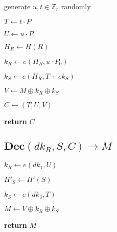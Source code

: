 \documentclass[a4paper]{article}
\begin{document}
generate $u, t \in \mathbb{Z}_r$ randomly

$T \gets t \cdot P$

$U \gets u \cdot P$

$H_R \gets H(R)$

$k_R \gets e(H_R, u \cdot P_0)$

$k_S \gets e(H_R, T + \textit{ek}_S)$

$V \gets M \oplus k_R \oplus k_S$

$C \gets (T, U, V)$

\textbf{return} $C$	

\subsection{$\textbf{Dec}(\textit{dk}_R, S, C) \rightarrow M$}

$k_R \gets e(\textit{dk}_1, U)$

$H'_S \gets H'(S)$

$k_S \gets e(\textit{dk}_3, T)$

$M \gets V \oplus k_R \oplus k_S$

\textbf{return} $M$
\end{document}
